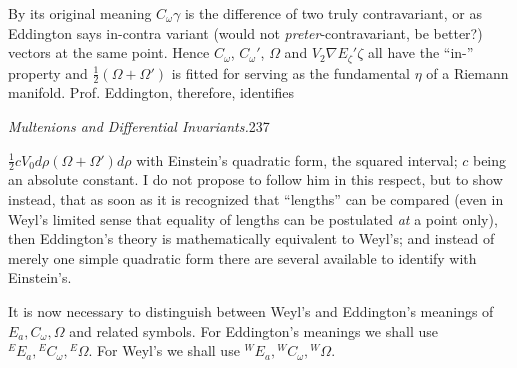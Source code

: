 \documentclass[11pt]{article}
\begin{document}
\indent By its original meaning $C_\omega\gamma$ is the difference of two truly contravariant, or as Eddington says in-contra variant (would not \emph{preter}-contravariant, be better?) vectors at the same point. Hence $C_\omega$, $C_\omega'$, $\Omega$ and $V_2\nabla E_\zeta'\zeta$ all have the ``in-'' property and $\tfrac12(\Omega+\Omega')$ is fitted for serving as the fundamental $\eta$ of a Riemann manifold. Prof. Eddington, therefore, identifies
\newpage\thispagestyle{empty}\begin{center}\textit{Multenions and Differential Invariants.}\hfill 237\end{center}
$\tfrac12cV_0d\rho(\Omega+\Omega')d\rho$ with Einstein's quadratic form, the squared interval; $c$ being an absolute constant. I do not propose to follow him in this respect, but to show instead, that as soon as it is recognized that ``lengths'' can be compared (even in Weyl's limited sense that equality of lengths can be postulated \emph{at} a point only), then Eddington's theory is mathematically equivalent to Weyl's; and instead of merely one simple quadratic form there are several available to identify with Einstein's.

\indent It is now necessary to distinguish between Weyl's and Eddington's meanings of $E_a,C_\omega,\Omega$ and related symbols. For Eddington's meanings we shall use ${}^E E_a,{}^E C_\omega,{}^E\Omega$. For Weyl's we shall use ${}^W E_a,{}^W C_\omega,{}^W\Omega$.
\end{document}
